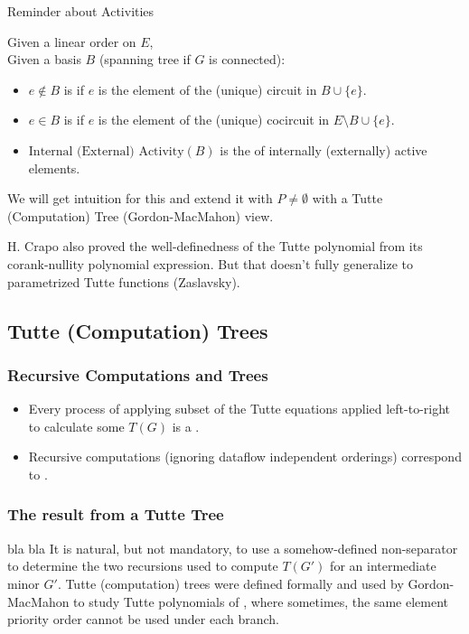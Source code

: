 \documentclass{beamer}
\begin{document}
\begin{frame}{Reminder about Activities}

Given a linear order on $E$,\\
\hspace{0.5in}Given a basis $B$ (spanning tree if $G$ is connected):
\begin{itemize}
\item $e\not\in B$ is  if $e$ is the 
 element of the (unique) circuit in 
$B\cup\{e\}$.
\item $e\in B$ is  if $e$ is the 
 element of the (unique) cocircuit in 
$E\setminus B\cup\{e\}$.
\item $\text{Internal (External) Activity}(B)$ is the 
 of internally (externally) active elements.
\end{itemize}

We will get intuition for this and extend it with $P\neq\emptyset$
with a Tutte (Computation) Tree (Gordon-MacMahon) view.

\vfill
H. Crapo also proved the well-definedness of the
Tutte polynomial from its corank-nullity polynomial 
expression.  But that doesn't fully generalize to
parametrized Tutte functions (Zaslavsky).

\end{frame}

\subsection{Tutte (Computation) Trees}
\begin{frame}
\frametitle{Recursive Computations and Trees}
\begin{itemize}
\item Every process of applying 
subset of the Tutte equations applied left-to-right
to calculate some $T(G)$ is a .
\item Recursive computations (ignoring dataflow independent 
orderings) correspond to .
\end{itemize}
\end{frame}

\begin{frame}
\frametitle{The result from a Tutte Tree}
bla bla
\vfill
It is natural, but not mandatory, to use a somehow-defined
 non-separator to determine the two recursions
used to compute $T(G')$ for an intermediate minor $G'$.
\vfill
Tutte (computation) trees were defined formally and
used by Gordon-MacMahon to study Tutte polynomials of
, where sometimes, the same element 
priority order
cannot be used under each branch.
\end{frame}
\end{document}
